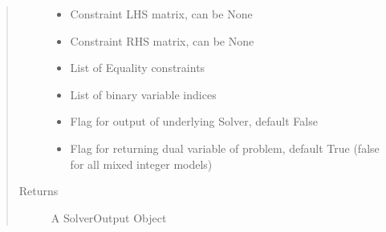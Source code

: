 \documentclass[letterpaper,10pt,english]{sphinxmanual}
\begin{document}
\begin{fulllineitems}
\begin{quote}
\begin{description}
\begin{itemize}
\item {} 
\sphinxAtStartPar
{} \textendash{} Constraint LHS matrix, can be None

\item {} 
\sphinxAtStartPar
{} \textendash{} Constraint RHS matrix, can be None

\item {} 
\sphinxAtStartPar
{} \textendash{} List of Equality constraints

\item {} 
\sphinxAtStartPar
{} \textendash{} List of binary variable indices

\item {} 
\sphinxAtStartPar
{} \textendash{} Flag for output of underlying Solver, default False

\item {} 
\sphinxAtStartPar
{} \textendash{} Flag for returning dual variable of problem, default True (false for all mixed integer models)

\end{itemize}

\item[{Returns}] \leavevmode
\sphinxAtStartPar
A SolverOutput Object

\end{description}\end{quote}

\end{fulllineitems}

\end{document}
